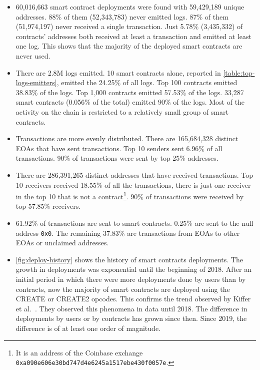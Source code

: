 \begin{itemize}
    \item 60,016,663 smart contract deployments were found with 59,429,189 unique addresses. 88\% of them (52,343,783) never emitted logs. 87\% of them (51,974,197) never received a single transaction. Just 5.78\% (3,435,332) of contracts' addresses both received at least a transaction and emitted at least one log. This shows that the majority of the deployed smart contracts are never used.
    
    \item There are 2.8M logs emitted. 10 smart contracts alone, reported in \cref{table:top-logs-emitters}, emitted the 24.25\% of all logs. Top 100 contracts emitted 38.83\% of the logs. Top 1,000 contracts emitted 57.53\% of the logs. 33,287 smart contracts (0.056\% of the total) emitted 90\% of the logs. Most of the activity on the chain is restricted to a relatively small group of smart contracts.
    
    \item Transactions are more evenly distributed. There are 165,684,328 distinct EOAs that have sent transactions. Top 10 senders sent 6.96\% of all transactions. 90\% of transactions were sent by top 25\% addresses. 
    
    \item There are 286,391,265 distinct addresses that have received transactions. Top 10 receivers received 18.55\% of all the transactions, there is just one receiver in the top 10 that is not a contract\footnote{It is an address of the Coinbase exchange {\tt 0xa090e606e30bd747d4e6245a1517ebe430f0057e}.}. 90\% of transactions were received by top 57.85\% receivers.
    
    \item 61.92\% of transactions are sent to smart contracts. 0.25\% are sent to the null address {\tt 0x0}. The remaining 37.83\% are transactions from EOAs to other EOAs or unclaimed addresses.
    
    \item \cref{fig:deploy-history} shows the history of smart contracts deployments. The growth in deployments was exponential until the beginning of 2018. After an initial period in which there were more deployments done by users than by contracts, now the majority of smart contracts are deployed using the CREATE or CREATE2 opcodes. This confirms the trend observed by Kiffer et al.~\cite{ethereum-sc-topology}. They observed this phenomena in data until 2018. The difference in deployments by users or by contracts has grown since then. Since 2019, the difference is of at least one order of magnitude.
\end{itemize}

